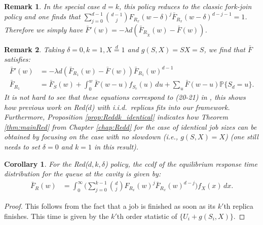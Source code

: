 \documentclass[12pt]{report}
\newtheorem{remark}{Remark}
\newtheorem{corollary}[theorem]{Corollary}
\begin{document}
\begin{remark}
In the special case $d=k$, this policy reduces to the classic fork-join policy and one 
finds that $\sum_{j=0}^{d-1} \binom{d-1}{j} F_{R_x}(w-\delta)^j \bar F_{R_x}(w-\delta)^{d-j-1}=1$. Therefore we simply have $\bar F'(w)=-\lambda d (\bar F_{R_{\tilde X}}(w) - \bar F(w))$. 
\end{remark}
\begin{remark}
Taking $\delta = 0, k=1, X\overset{d}{=}1$ and $g(S,X)=SX=S$, we find that $\bar F$ satisfies:
\begin{align*}
\bar F' (w)&=-\lambda d (\bar F_{R_1}(w)-\bar F(w)) \bar F_{R_1}(w)^{d-1}\\
\bar F_{R_1}&= \bar F_{S}(w) + \int_0^w \bar F(w-u) f_{S_c}(u)\, du + \sum_u \bar F(w-u) \mathbb{P}\{S_d=u\}.
\end{align*}
It is not hard to see that these equations correspond to (20-21) in \cite{gardnerOR}, this shows how previous work on Red($d$) with i.i.d.~replicas fits into our framework.  Furthermore, Proposition \ref{prop:Reddk_identical} indicates how Theorem \ref{thm:mainRed} from Chapter \ref{chap:Redd} for the case of identical job sizes can be obtained by focusing on the case with no slowdown (i.e., $g(S,X)=X$) (one still needs to set $\delta = 0$ and $k=1$ in this result).
\end{remark}
\begin{corollary}
For the Red($d,k,\delta$) policy, the ccdf of the equilibrium response time distribution for the queue at the cavity is given by:
\begin{align*}
\bar F_R(w)
&=
\int_0^\infty \bigg( \sum_{j=0}^{k-1} \binom{d}{j} F_{R_x}(w)^j \bar F_{R_x}(w)^{d-j} \bigg) f_X(x)\, dx.
\end{align*}
\end{corollary}
\begin{proof}
This follows from the fact that a job is finished as soon as its $k'$th replica finishes. This time is given by the $k'$th order statistic of $\{U_i+g(S_i,X)\}$.
\end{proof}
\end{document}
